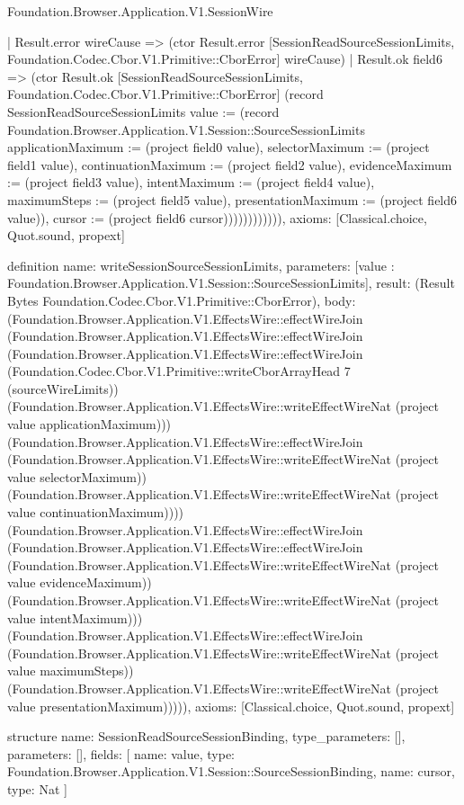 \begin{lexlean}{Foundation.Browser.Application.V1.SessionWire}
\begin{semanticmodule}
{                    | Result.error wireCause => (ctor Result.error [SessionReadSourceSessionLimits, Foundation.Codec.Cbor.V1.Primitive::CborError] wireCause)
                    | Result.ok field6 => (ctor Result.ok [SessionReadSourceSessionLimits, Foundation.Codec.Cbor.V1.Primitive::CborError] (record SessionReadSourceSessionLimits {value := (record Foundation.Browser.Application.V1.Session::SourceSessionLimits {applicationMaximum := (project field0 value), selectorMaximum := (project field1 value), continuationMaximum := (project field2 value), evidenceMaximum := (project field3 value), intentMaximum := (project field4 value), maximumSteps := (project field5 value), presentationMaximum := (project field6 value)}), cursor := (project field6 cursor)}))))))))))),
  axioms: [Classical.choice, Quot.sound, propext]
}

definition{
  name: writeSessionSourceSessionLimits,
  parameters: [value : Foundation.Browser.Application.V1.Session::SourceSessionLimits],
  result: (Result Bytes Foundation.Codec.Cbor.V1.Primitive::CborError),
  body: (Foundation.Browser.Application.V1.EffectsWire::effectWireJoin (Foundation.Browser.Application.V1.EffectsWire::effectWireJoin (Foundation.Browser.Application.V1.EffectsWire::effectWireJoin (Foundation.Codec.Cbor.V1.Primitive::writeCborArrayHead 7 (sourceWireLimits)) (Foundation.Browser.Application.V1.EffectsWire::writeEffectWireNat (project value applicationMaximum))) (Foundation.Browser.Application.V1.EffectsWire::effectWireJoin (Foundation.Browser.Application.V1.EffectsWire::writeEffectWireNat (project value selectorMaximum)) (Foundation.Browser.Application.V1.EffectsWire::writeEffectWireNat (project value continuationMaximum)))) (Foundation.Browser.Application.V1.EffectsWire::effectWireJoin (Foundation.Browser.Application.V1.EffectsWire::effectWireJoin (Foundation.Browser.Application.V1.EffectsWire::writeEffectWireNat (project value evidenceMaximum)) (Foundation.Browser.Application.V1.EffectsWire::writeEffectWireNat (project value intentMaximum))) (Foundation.Browser.Application.V1.EffectsWire::effectWireJoin (Foundation.Browser.Application.V1.EffectsWire::writeEffectWireNat (project value maximumSteps)) (Foundation.Browser.Application.V1.EffectsWire::writeEffectWireNat (project value presentationMaximum))))),
  axioms: [Classical.choice, Quot.sound, propext]
}

structure{
  name: SessionReadSourceSessionBinding,
  type_parameters: [],
  parameters: [],
  fields: [
    {name: value, type: Foundation.Browser.Application.V1.Session::SourceSessionBinding},
    {name: cursor, type: Nat}
  ]
}


\end{semanticmodule}
\end{lexlean}
